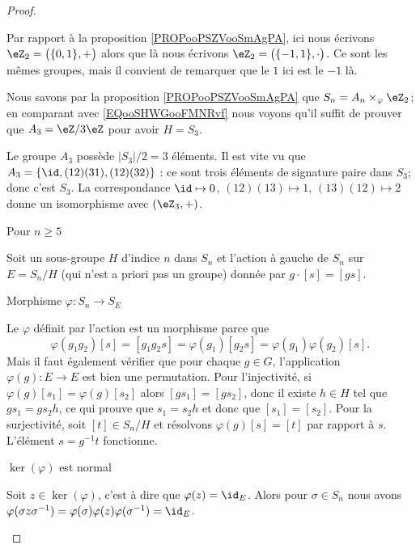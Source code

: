 \begin{proof}
\begin{subproof}
            Par rapport à la proposition \ref{PROPooPSZVooSmAgPA}, ici nous écrivons \( \eZ_2=\big( \{ 0,1 \},+ \big)\) alors que là nous écrivons \( \eZ_2=\big( \{ -1,1 \},\cdot \big)\). Ce sont les mêmes groupes, mais il convient de remarquer que le \( 1\) ici est le \( -1\) là.

            Nous savons par la proposition \ref{PROPooPSZVooSmAgPA} que \( S_n=A_n\times_{\varphi}\eZ_2\); en comparant avec \eqref{EQooSHWGooFMNRvf} nous voyons qu'il suffit de prouver que \( A_3=\eZ/3\eZ\) pour avoir \( H=S_3\).

            Le groupe \( A_3\) possède \( | S_3 |/2=3\) éléments. Il est vite vu que \( A_3=\{ \id,(12)(31), (12)(32) \}\) : ce sont trois éléments de signature paire dans \( S_3\); donc c'est \( S_3\). La correspondance \( \id\mapsto 0\), \( (12)(13)\mapsto 1\), \( (13)(12)\mapsto 2\) donne un isomorphisme avec \( (\eZ_3,+)\).

        \item[Pour \( n\geq 5\)]

            Soit un sous-groupe \( H\) d'indice \( n\) dans \( S_n\) et l'action à gauche de \( S_n\) sur \( E=S_n/H\) (qui n'est a priori pas un groupe) donnée par \( g\cdot [s]=[gs]\).

            \begin{subproof}
                \item[Morphisme \( \varphi\colon S_n\to S_E\)]

                    Le \( \varphi\) définit par l'action est un morphisme parce que
                    \begin{equation}
                        \varphi(g_1g_2)[s]=[g_1g_2s]=\varphi(g_1)[g_2s]=\varphi(g_1)\varphi(g_2)[s].
                    \end{equation}
                    Mais il faut également vérifier que pour chaque \( g\in G\), l'application \( \varphi(g)\colon E\to E\) est bien une permutation. Pour l'injectivité, si \( \varphi(g)[s_1]=\varphi(g)[s_2]\) alors \( [gs_1]=[gs_2]\), donc il existe \( h\in H\) tel que \( gs_1=gs_2h\), ce qui prouve que \( s_1=s_2h\) et donc que \( [s_1]=[s_2]\). Pour la surjectivité, soit \( [t]\in S_n/H\) et résolvons \( \varphi(g)[s]=[t]\) par rapport à \( s\). L'élément \( s=g^{-1} t\) fonctionne.

                \item[\( \ker(\varphi)\) est normal]

                    Soit \( z\in\ker(\varphi)\), c'est à dire que \( \varphi(z)=\id_E\). Alors pour \( \sigma\in S_n\) nous avons \( \varphi(\sigma z\sigma^{-1})=\varphi(\sigma)\varphi(z)\varphi(\sigma^{-1})=\id_E\).
            

\end{subproof}
\end{subproof}
\end{proof}
